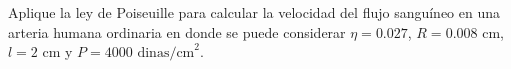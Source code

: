 \item Aplique la ley de Poiseuille para calcular la velocidad del flujo sanguíneo en una arteria humana ordinaria en donde se puede considerar $\eta = 0.027$, $R = 0.008 \text{ cm}$, $l = 2 \text{ cm}$ y $P = 4000 \text{ dinas/cm}^2$.

